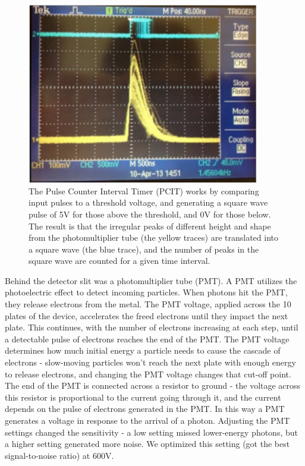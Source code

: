 \documentclass[prb,preprint]{revtex4-1}
\begin{document}
\begin{figure}[h!]
\centering
\includegraphics[width=4in]{PCITdiscriminator.pdf}
\caption{The Pulse Counter Interval Timer (PCIT) works by comparing input pulses to a threshold voltage, and generating a square wave pulse of 5V for those above the threshold, and 0V for those below. The result is that the irregular peaks of different height and shape from the photomultiplier tube (the yellow traces) are translated into a square wave (the blue trace), and the number of peaks in the square wave are counted for a given time interval. }
\label{PCITdiscriminator}
\end{figure}

Behind the detector slit was a photomultiplier tube (PMT).  A PMT utilizes the photoelectric effect to detect incoming particles. When photons hit the PMT, they release electrons from the metal. The PMT voltage, applied across the 10 plates of the device, accelerates the freed electrons until they impact the next plate.  This continues, with the number of electrons increasing at each step, until a detectable pulse of electrons reaches the end of the PMT.  The PMT voltage determines how much initial energy a particle needs to cause the cascade of electrons - slow-moving particles won't reach the next plate with enough energy to release electrons, and changing the PMT voltage changes that cut-off point.  The end of the PMT is connected across a resistor to ground - the voltage across this resistor is proportional to the current going through it, and the current depends on the pulse of electrons generated in the PMT.  In this way a PMT generates a voltage in response to the arrival of a photon.  Adjusting the PMT settings changed the sensitivity - a low setting missed lower-energy photons, but a higher setting generated more noise.  We optimized this setting (got the best signal-to-noise ratio) at 600V.  
\end{document}

